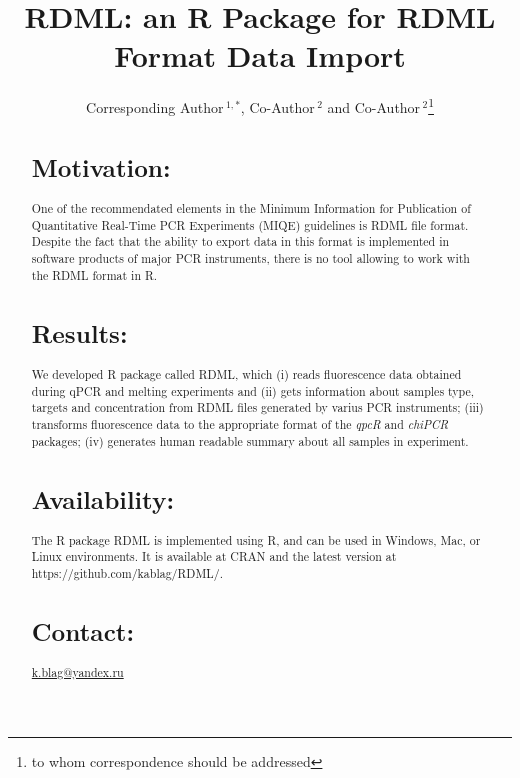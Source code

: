 \documentclass{bioinfo}
\begin{document}

\title[RDML]{RDML: an R Package for RDML Format Data Import}
\author[Sample \textit{et~al}]{Corresponding Author\,$^{1,*}$, Co-Author\,$^{2}$ and Co-Author\,$^2$\footnote{to whom correspondence should be addressed}}
\address{$^{1}$Department of XXXXXXX, Address XXXX etc.\\
$^{2}$Department of XXXXXXXX, Address XXXX etc.}



\maketitle

\begin{abstract}

\section{Motivation:}
One of the recommendated elements in the Minimum Information for Publication of Quantitative 
Real-Time PCR Experiments (MIQE) guidelines is RDML file format. Despite the fact that the ability to export data in this format is implemented in software products of major PCR instruments, there is no tool allowing to work with the RDML format in R.
\section{Results:}
We developed R package called RDML, which (i) reads fluorescence data obtained during qPCR and melting experiments and (ii) gets information about samples type, targets and concentration from RDML files generated by varius PCR instruments; (iii) transforms fluorescence data to the appropriate format of the \textit{qpcR} and \textit{chiPCR} packages; (iv) generates human readable summary about all samples in experiment.  
\section{Availability:}
The R package RDML is implemented using R, and can be used in Windows, Mac, or Linux environments. It is available at CRAN and the latest version at  https://github.com/kablag/RDML/.
\section{Contact:} \href{k.blag@yandex.ru}{k.blag@yandex.ru}
\end{abstract}
\end{document}
